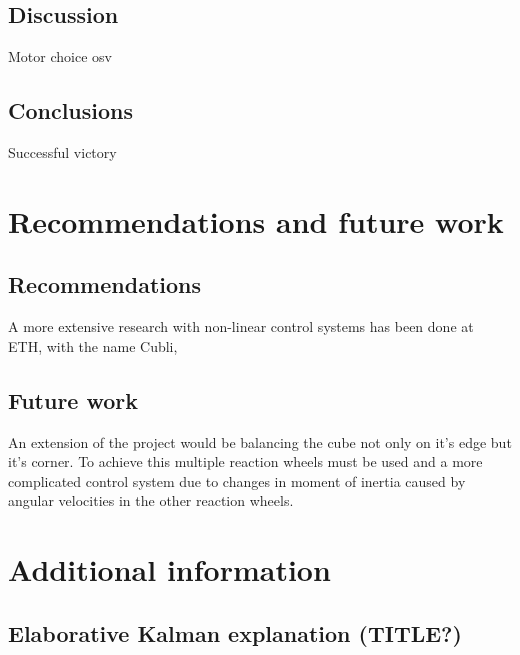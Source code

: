 \documentclass[a4paper,11pt]{kth-mag}
\begin{document}
\section{Discussion}
Motor choice osv

\section{Conclusions}
Successful victory


\chapter{Recommendations and future work}

\section{Recommendations}
A more extensive research with non-linear control systems has been done at ETH, with the name Cubli,\cite{cubliECC13}

\section{Future work}
An extension of the project would be balancing the cube not only on it's edge but it's corner. To achieve this multiple reaction wheels must be used and a more complicated control system due to changes in moment of inertia caused by angular velocities in the other reaction wheels.

%
\cleardoublepage


\cleardoublepage
\appendix
{}


\chapter{Additional information} \label{appA}
\section{Elaborative Kalman explanation (TITLE?)} \label{app: Kalman}
\end{document}
